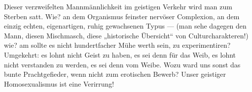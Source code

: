 Dieser verzweifelten Mannmännlichkeit im geistigen Verkehr wird man zum Sterben satt. Wie? an dem Organismus feinster nervöser Complexion, an dem einzig echten, eigenartigen, ruhig gewachsenen Typus — (man sehe dagegen den Mann, diesen Mischmasch, diese „historische Übersicht“ von Culturcharakteren!) wie? am  sollte es nicht hundertfacher Mühe werth sein, zu experimentiren?  Umgekehrt: es lohnt nicht Geist zu haben, es sei denn für das Weib, es lohnt nicht verstanden zu werden, es sei denn vom Weibe. Wozu ward uns sonst das bunte Prachtgefieder, wenn nicht zum erotischen Bewerb? Unser geistiger Homosexualismus ist  eine Verirrung!
\par

